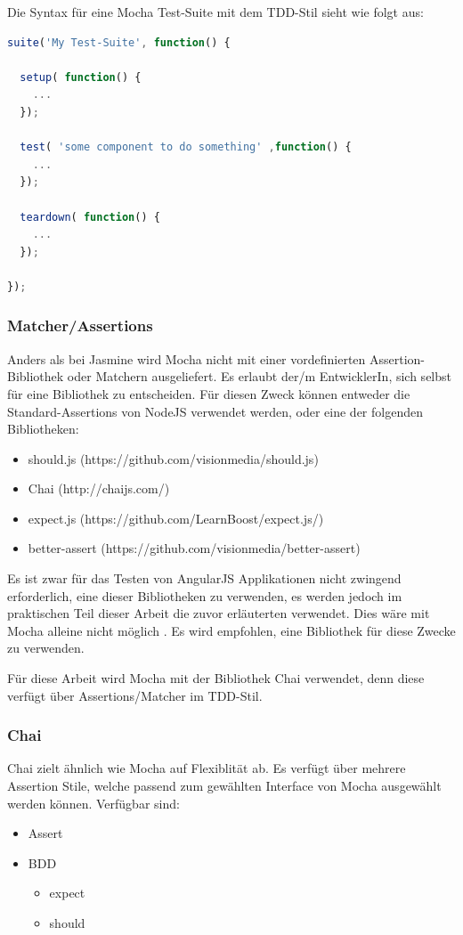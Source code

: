 Die Syntax für eine Mocha Test-Suite mit dem TDD-Stil sieht wie folgt aus:
\begin{lstlisting}[language=JavaScript]
suite('My Test-Suite', function() {

  setup( function() {
    ...
  });

  test( 'some component to do something' ,function() {
    ...
  });

  teardown( function() {
    ...
  });

});

\end{lstlisting}

\subsubsection{Matcher/Assertions}
Anders als bei Jasmine wird Mocha nicht mit einer vordefinierten Assertion-Bibliothek oder Matchern ausgeliefert. Es erlaubt der/m EntwicklerIn, sich selbst für eine Bibliothek zu entscheiden. Für diesen Zweck können entweder die Standard-Assertions von NodeJS verwendet werden, oder eine der folgenden Bibliotheken:

\begin{itemize}
  \item should.js (https://github.com/visionmedia/should.js)
  \item Chai (http://chaijs.com/)
  \item expect.js (https://github.com/LearnBoost/expect.js/)
  \item better-assert (https://github.com/visionmedia/better-assert)
\end{itemize}

Es ist zwar für das Testen von AngularJS Applikationen nicht zwingend erforderlich, eine dieser Bibliotheken zu verwenden, es werden jedoch im praktischen Teil dieser Arbeit die zuvor erläuterten  verwendet. Dies wäre mit Mocha alleine nicht möglich \autocite{Mocha:Spies}. Es wird empfohlen, eine Bibliothek für diese Zwecke zu verwenden.

Für diese Arbeit wird Mocha mit der Bibliothek Chai verwendet, denn diese verfügt über Assertions/Matcher im TDD-Stil.

\subsubsection{Chai}
Chai zielt ähnlich wie Mocha auf Flexiblität ab. Es verfügt über mehrere Assertion Stile, welche passend zum gewählten Interface von Mocha ausgewählt werden können.
Verfügbar sind:
\begin{itemize}
  \item Assert
  \item BDD
  \begin{itemize}
    \item expect
    \item should
  \end{itemize}
\end{itemize}

